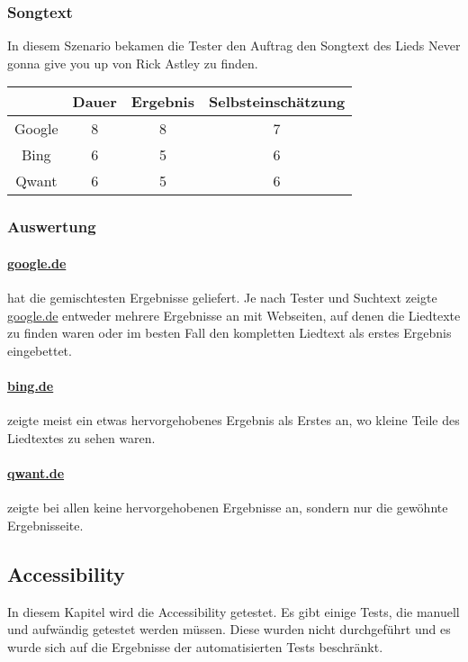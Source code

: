 \subsubsection{Songtext}\label{subsubsec:szenario3}
In diesem Szenario bekamen die Tester den Auftrag den Songtext des Lieds Never gonna give you up von Rick Astley zu finden.

\begin{tabular}{|c|c|c|c|}
    \hline
    & Dauer & Ergebnis & Selbsteinschätzung \\
    \hline
    Google & 8     & 8       & 7                  \\
    \hline
    Bing   & 6     & 5        & 6                  \\
    \hline
    Qwant  & 6     & 5        & 6                  \\
    \hline
\end{tabular}

\subsubsection*{Auswertung}
\paragraph{\url{google.de}} hat die gemischtesten Ergebnisse geliefert.
Je nach Tester und Suchtext zeigte \url{google.de} entweder mehrere Ergebnisse an mit Webseiten,
auf denen die Liedtexte zu finden waren oder im besten Fall den kompletten Liedtext als erstes Ergebnis eingebettet.
\paragraph{\url{bing.de}} zeigte meist ein etwas hervorgehobenes Ergebnis als Erstes an, wo kleine Teile des Liedtextes zu sehen waren.
\paragraph{\url{qwant.de}} zeigte bei allen keine hervorgehobenen Ergebnisse an, sondern nur die gewöhnte Ergebnisseite.

\subsection{Accessibility}\label{subsec:accessibility2}
In diesem Kapitel wird die Accessibility getestet.
Es gibt einige Tests, die manuell und aufwändig getestet werden müssen.
Diese wurden nicht durchgeführt und es wurde sich auf die Ergebnisse der automatisierten Tests beschränkt.

